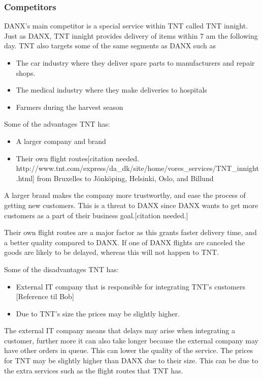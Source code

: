\subsubsection{Competitors}
DANX’s main competitor is a special service within TNT called TNT innight.
Just as DANX, TNT innight provides delivery of items within 7 am the following day.
TNT also targets some of the same segments as DANX such as 

\begin{itemize}
\item The car industry where they deliver spare parts to manufacturers and repair shops.
\item The medical industry where they make deliveries to hospitals
\item Farmers during the harvest season
\end{itemize}

Some of the advantages TNT has:
\begin{itemize}
\item A larger company and brand
\item Their own flight routes[citation needed. http://www.tnt.com/express/da\_dk/site/home/vores\_services/TNT\_innight.html] from Bruxelles to Jönköping, Helsinki, Oslo, and Billund
\end{itemize}

A larger brand makes the company more trustworthy, and ease the process of getting new customers. This is a threat to DANX since DANX wants to get more customers as a part of their business goal.[citation needed.]

Their own flight routes are a major factor as this grants faster delivery time, and a better quality compared to DANX. If one of DANX flights are canceled the goods are likely to be delayed, whereas this will not happen to TNT.

Some of the disadvantages TNT has:
\begin{itemize}
\item External IT company that is responsible for integrating TNT’s customers [Reference til Bob]
\item Due to TNT’s size the prices may be slightly higher.
\end{itemize}

The external IT company means that delays may arise when integrating a customer, further more it can also take longer because the external company may have other orders in queue. This can lower the quality of the service.
The prices for TNT may be slightly higher than DANX due to their size. This can be due to the extra services such as the flight routes that TNT has. \\

